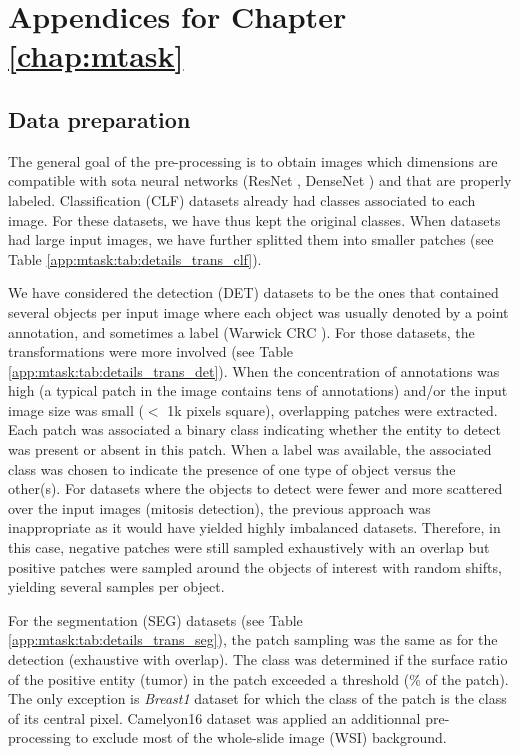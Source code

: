 \chapter{Appendices for Chapter \ref{chap:mtask}}
\label{app:mtask}

\section{Data preparation}
\label{app:mtask:sec:datasets}

The general goal of the pre-processing is to obtain images which dimensions are compatible with \acrlong{sota} neural networks (\eg ResNet \cite{he2016deep}, DenseNet \cite{huang2017densely}) and that are properly labeled. Classification (CLF) datasets already had classes associated to each image. For these datasets, we have thus kept the original classes. When datasets had large input images, we have further splitted them into smaller patches (see Table \ref{app:mtask:tab:details_trans_clf}).

We have considered the detection (DET) datasets to be the ones that contained several objects per input image where each object was usually denoted by a point annotation, and sometimes a label (\eg Warwick CRC \cite{sirinukunwattana2016locality}). For those datasets, the transformations were more involved (see Table \ref{app:mtask:tab:details_trans_det}). When the concentration of annotations was high (\ie a typical patch in the image contains tens of annotations) and/or the input image size was small (\ie $<$ 1k pixels square), overlapping patches were extracted. Each patch was associated a binary class indicating whether the entity to detect was present or absent in this patch. When a label was available, the associated class was chosen to indicate the presence of one type of object versus the other(s). For datasets where the objects to detect were fewer and more scattered over the input images (\eg mitosis detection), the previous approach was inappropriate as it would have yielded highly imbalanced datasets. Therefore, in this case, negative patches were still sampled exhaustively with an overlap but positive patches were sampled around the objects of interest with random shifts, yielding several samples per object. 

For the segmentation (SEG) datasets (see Table \ref{app:mtask:tab:details_trans_seg}), the patch sampling was the same as for the detection (\ie exhaustive with overlap). The class was determined if the surface ratio of the positive entity (\eg tumor) in the patch exceeded a threshold (\% of the patch). The only exception is \textit{Breast1} dataset for which the class of the patch is the class of its central pixel. Camelyon16 \cite{bejnordi2017diagnostic} dataset was applied an additionnal pre-processing to exclude most of the whole-slide image (WSI) background.

